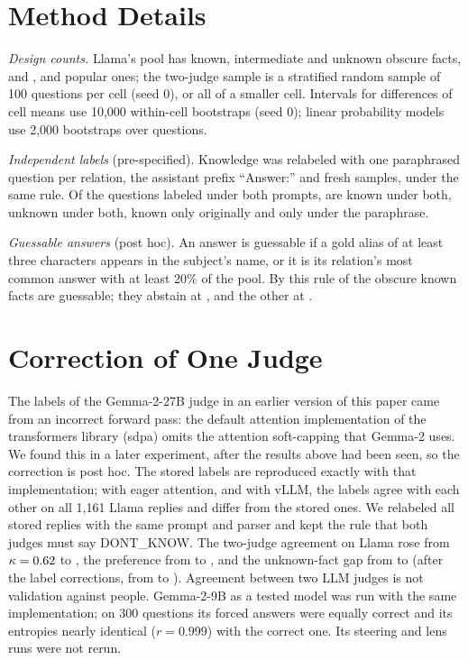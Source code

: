 \documentclass[manuscript,screen,review,anonymous,nonacm]{acmart}
\begin{document}
\appendix

\section{Method Details}
\label{app:robust}

\emph{Design counts.} Llama's pool has \lkObsPoolKnown{} known, \lkObsPoolMaybe{} intermediate and \lkObsPoolUnk{} unknown obscure facts, and \lkPopPoolKnown{}, \lkPopPoolMaybe{} and \lkPopPoolUnk{} popular ones; the two-judge sample is a stratified random sample of 100 questions per cell (seed 0), or all of a smaller cell. Intervals for differences of cell means use 10,000 within-cell bootstraps (seed 0); linear probability models use 2,000 bootstraps over questions.

\emph{Independent labels} (pre-specified). Knowledge was relabeled with one paraphrased question per relation, the assistant prefix ``Answer:'' and fresh samples, under the same rule. Of the \lcBothN{} questions labeled under both prompts, \lcKK{} are known under both, \lcUU{} unknown under both, \lcKU{} known only originally and \lcUK{} only under the paraphrase.

\emph{Guessable answers} (post hoc). An answer is guessable if a gold alias of at least three characters appears in the subject's name, or it is its relation's most common answer with at least 20\% of the pool. By this rule \rcGuessN{} of the \gsObsKnownTotal{} obscure known facts are guessable; they abstain at \rcGuessAbs, and the other \rcNonGuessN{} at \rcNonGuessAbs.

\section{Correction of One Judge}
\label{app:judge}

The labels of the Gemma-2-27B judge in an earlier version of this paper came from an incorrect forward pass: the default attention implementation of the transformers library (sdpa) omits the attention soft-capping that Gemma-2 uses. We found this in a later experiment, after the results above had been seen, so the correction is post hoc. The stored labels are reproduced exactly with that implementation; with eager attention, and with vLLM, the labels agree with each other on all 1{,}161 Llama replies and differ from the stored ones. We relabeled all \cRejudged{} stored replies with the same prompt and parser and kept the rule that both judges must say DONT\_KNOW. The two-judge agreement on Llama rose from $\kappa=0.62$ to \hmLlamaKappa{}, the preference from \asPrintedMargin{} \asPrintedMarginCI{} to \hmLlamaDiff{} \hmLlamaDiffCI, and the unknown-fact gap from \asPrintedUnk{} \asPrintedUnkCI{} to \rcUnk{} \rcUnkCI{} (after the label corrections, from \asPrintedUnkJoint{} \asPrintedUnkJointCI{} to \rcUnkJoint{} \rcUnkJointCI). Agreement between two LLM judges is not validation against people. Gemma-2-9B as a tested model was run with the same implementation; on 300 questions its forced answers were equally correct and its entropies nearly identical ($r=0.999$) with the correct one. Its steering and lens runs were not rerun.
\end{document}
